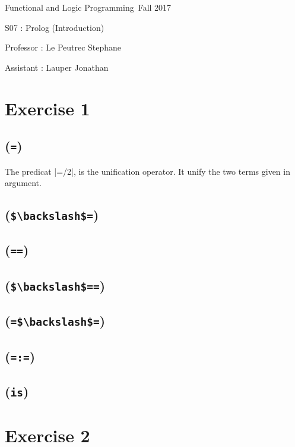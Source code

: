 \documentclass[a4paper,11pt]{report}
\author{Sylvain Julmy}
\date{\today}
\begin{document}
\begin{center}
  \Large{
    Functional and Logic Programming\
    Fall 2017
  }
  
  \noindent\makebox[\linewidth]{\rule{\linewidth}{0.4pt}}
  S07 : Prolog (Introduction)
  \noindent\makebox[\linewidth]{\rule{\linewidth}{0.4pt}}

  \begin{flushleft}
    Professor : Le Peutrec Stephane
    
    Assistant : Lauper Jonathan
  \end{flushleft}

  \noindent\makebox[\linewidth]{\rule{\textwidth}{1pt}}
\end{center}

\section*{Exercise 1}

\subsection*{(\protect\Verb+=+)}

The predicat \prologinline|=/2|, is the unification operator. It unify the two
terms given in argument.

\subsection*{(\protect\Verb+$\backslash$=+)}

\subsection*{(\protect\Verb+==+)}

\subsection*{(\protect\Verb+$\backslash$==+)}

\subsection*{(\protect\Verb+=$\backslash$=+)}

\subsection*{(\protect\Verb+=:=+)}

\subsection*{(\protect\Verb+is+)}

\section*{Exercise 2}
\end{document}
